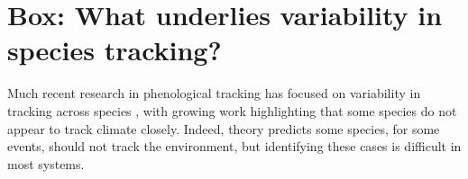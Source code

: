 \documentclass[11pt,letterpaper]{article}
\begin{document}


\section{Box: What underlies variability in species tracking?}
Much recent research in phenological tracking has focused on variability in tracking across species \citep[e.g.,][]{Willis:2008bf,Cook:2012pnas,bolmgren2013,CaraDonna2014,Zettlemoyer2019}, with growing work highlighting that some species do not appear to track climate closely. Indeed, theory predicts some species, for some events, should not track the environment, but identifying these cases is difficult in most systems. %
\end{document}

